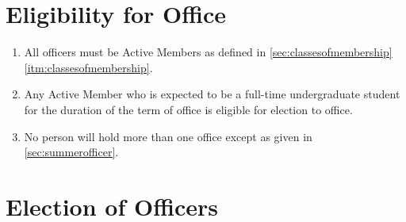 \documentclass[12pt,letterpaper,oneside]{book}
\begin{document}
\section{Eligibility for Office} \label{sec:eligibilityforoffice}

\begin{enumerate}

\item All officers must be Active Members as defined in \cref{sec:classesofmembership} \cref{itm:classesofmembership}.
\item Any Active Member who is expected to be a full-time undergraduate student for the duration of the term of office is eligible for election to office.
\item No person will hold more than one office except as given in \cref{sec:summerofficer}.

\end{enumerate}

\section{Election of Officers} \label{sec:electionprocedures}
\end{document}
